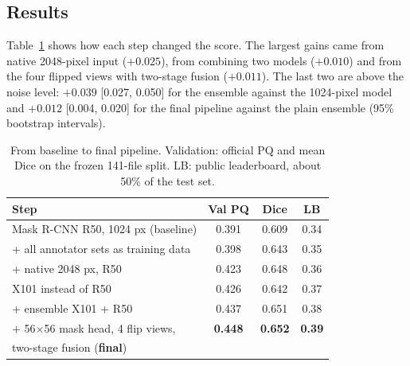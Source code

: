 \subsection{Results}
Table~\ref{tab:journey} shows how each step changed the score. The largest gains came from native 2048-pixel input
($+0.025$), from combining two models ($+0.010$) and from the four flipped views with two-stage fusion ($+0.011$).
The last two are above the noise level: $+0.039$ [0.027, 0.050] for the ensemble against the 1024-pixel model and
$+0.012$ [0.004, 0.020] for the final pipeline against the plain ensemble (95\% bootstrap intervals).

\begin{table}[t]
\centering
\caption{From baseline to final pipeline. Validation: official PQ and mean Dice on the frozen 141-file split.
LB: public leaderboard, about 50\% of the test set.}
\label{tab:journey}
\small
\begin{tabular}{@{}lccc@{}}
\hline
Step & Val PQ & Dice & LB \\
\hline
Mask R-CNN R50, 1024 px (baseline)     & 0.391 & 0.609 & 0.34 \\ %
+ all annotator sets as training data  & 0.398 & 0.643 & 0.35 \\ %
+ native 2048 px, R50                  & 0.423 & 0.648 & 0.36 \\ %
\quad X101 instead of R50              & 0.426 & 0.642 & 0.37 \\ %
+ ensemble X101 + R50                  & 0.437 & 0.651 & 0.38 \\ %
+ 56$\times$56 mask head, 4 flip views, & \textbf{0.448} & \textbf{0.652} & \textbf{0.39} \\ %
\quad two-stage fusion (\textbf{final}) & & & \\
\hline
\end{tabular}
\end{table}

